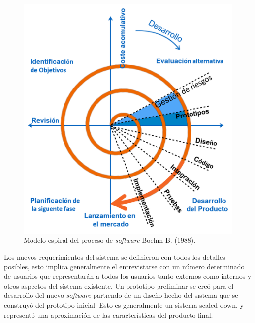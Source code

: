 \begin{figure}[H]
\centering
\includegraphics[scale=0.5]{espiral.jpg}
\caption{Modelo espiral del proceso de \textit{software} Boehm B. (1988).}
\end{figure}

Los nuevos requerimientos del sistema se definieron con todos los detalles posibles, esto implica generalmente el entrevistarse con un n\'umero determinado  de usuarios que representar\'an a todos los usuarios tanto externos como internos y otros aspectos del sistema existente. Un prototipo preliminar se cre\'o  para el desarrollo del nuevo \textit{software}  partiendo de un diseño hecho del sistema que se construy\'o del prototipo inicial. Esto es generalmente un sistema  scaled-down, y represent\'o una aproximaci\'on de las caracter\'isticas del producto final.\\
 
